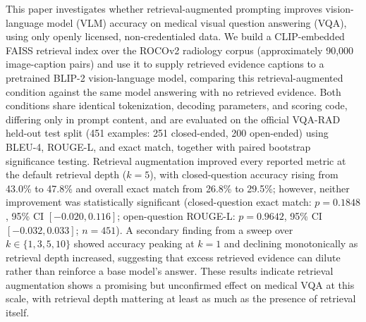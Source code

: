 This paper investigates whether retrieval-augmented prompting
improves vision-language model (VLM) accuracy on medical
visual question answering (VQA), using only openly licensed,
non-credentialed data. We build a CLIP-embedded FAISS
retrieval index over the ROCOv2 radiology corpus (approximately
90{,}000 image-caption pairs) and use it to supply retrieved
evidence captions to a pretrained BLIP-2 vision-language model,
comparing this retrieval-augmented condition against the same
model answering with no retrieved evidence. Both conditions
share identical tokenization, decoding parameters, and scoring
code, differing only in prompt content, and are evaluated on the
official VQA-RAD held-out test split (451 examples: 251
closed-ended, 200 open-ended) using BLEU-4, ROUGE-L, and exact
match, together with paired bootstrap significance testing.
Retrieval augmentation improved every reported metric at the
default retrieval depth ($k=5$), with closed-question accuracy
rising from 43.0\% to 47.8\% and overall exact match from
26.8\% to 29.5\%; however, neither improvement was statistically
significant (closed-question exact match: $p=0.1848$, 95\% CI
$[-0.020, 0.116]$; open-question ROUGE-L: $p=0.9642$, 95\% CI
$[-0.032, 0.033]$; $n=451$). A secondary finding from a sweep over
$k \in \{1,3,5,10\}$ showed accuracy peaking at $k=1$ and declining
monotonically as retrieval depth increased, suggesting that excess
retrieved evidence can dilute rather than reinforce a base model's
answer. These results indicate retrieval augmentation shows a
promising but unconfirmed effect on medical VQA at this scale, with
retrieval depth mattering at least as much as the presence of
retrieval itself.
